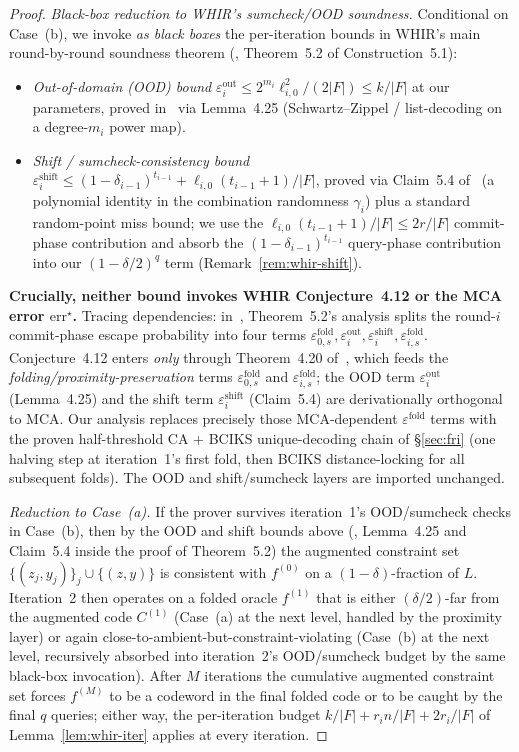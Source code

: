 \documentclass[11pt]{article}
\begin{document}
\begin{proof}
\emph{Black-box reduction to WHIR's sumcheck/OOD soundness.} Conditional on Case~(b), we invoke \emph{as black boxes} the per-iteration bounds in WHIR's main round-by-round soundness theorem (\cite{WHIR}, Theorem~5.2 of Construction~5.1):
\begin{itemize}[nosep]
\item \emph{Out-of-domain (OOD) bound} $\varepsilon^{\mathrm{out}}_i \leq 2^{m_i}\ell_{i,0}^2 / (2|F|) \leq k/|F|$ at our parameters, proved in~\cite{WHIR} via Lemma~4.25 (Schwartz--Zippel / list-decoding on a degree-$m_i$ power map).
\item \emph{Shift / sumcheck-consistency bound} $\varepsilon^{\mathrm{shift}}_i \leq (1{-}\delta_{i-1})^{t_{i-1}} + \ell_{i,0}(t_{i-1}{+}1)/|F|$, proved via Claim~5.4 of~\cite{WHIR} (a polynomial identity in the combination randomness $\gamma_i$) plus a standard random-point miss bound; we use the $\ell_{i,0}(t_{i-1}{+}1)/|F| \leq 2r/|F|$ commit-phase contribution and absorb the $(1{-}\delta_{i-1})^{t_{i-1}}$ query-phase contribution into our $(1{-}\delta/2)^q$ term (Remark~\ref{rem:whir-shift}).
\end{itemize}
\textbf{Crucially, neither bound invokes WHIR Conjecture~4.12 or the MCA error $\mathrm{err}^\star$.} Tracing dependencies: in~\cite{WHIR}, Theorem~5.2's analysis splits the round-$i$ commit-phase escape probability into four terms $\varepsilon^{\mathrm{fold}}_{0,s}, \varepsilon^{\mathrm{out}}_i, \varepsilon^{\mathrm{shift}}_i, \varepsilon^{\mathrm{fold}}_{i,s}$.  Conjecture~4.12 enters \emph{only} through Theorem~4.20 of~\cite{WHIR}, which feeds the \emph{folding/proximity-preservation} terms $\varepsilon^{\mathrm{fold}}_{0,s}$ and $\varepsilon^{\mathrm{fold}}_{i,s}$; the OOD term $\varepsilon^{\mathrm{out}}_i$ (Lemma~4.25) and the shift term $\varepsilon^{\mathrm{shift}}_i$ (Claim~5.4) are derivationally orthogonal to MCA. Our analysis replaces precisely those MCA-dependent $\varepsilon^{\mathrm{fold}}$ terms with the proven half-threshold CA + BCIKS unique-decoding chain of \S\ref{sec:fri} (one halving step at iteration~1's first fold, then BCIKS distance-locking for all subsequent folds). The OOD and shift/sumcheck layers are imported unchanged.

\emph{Reduction to Case~(a).} If the prover survives iteration~1's OOD/sumcheck checks in Case~(b), then by the OOD and shift bounds above (\cite{WHIR}, Lemma~4.25 and Claim~5.4 inside the proof of Theorem~5.2) the augmented constraint set $\{(z_j, y_j)\}_j \cup \{(z, y)\}$ is consistent with $f^{(0)}$ on a $(1-\delta)$-fraction of $L$. Iteration~2 then operates on a folded oracle $f^{(1)}$ that is either $(\delta/2)$-far from the augmented code $C^{(1)}$ (Case~(a) at the next level, handled by the proximity layer) or again close-to-ambient-but-constraint-violating (Case~(b) at the next level, recursively absorbed into iteration~2's OOD/sumcheck budget by the same black-box invocation). After $M$ iterations the cumulative augmented constraint set forces $f^{(M)}$ to be a codeword in the final folded code or to be caught by the final $q$ queries; either way, the per-iteration budget $k/|F| + r_i n/|F| + 2 r_i/|F|$ of Lemma~\ref{lem:whir-iter} applies at every iteration.


\end{proof}
\end{document}
